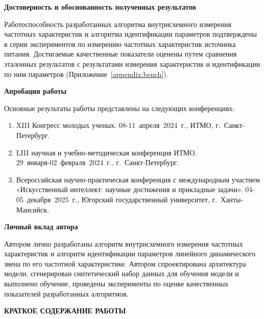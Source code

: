 \documentclass[a4paper, 14pt]{extarticle}
\begin{document}
    \noindent\textbf{Достоверность и обоснованность полученных результатов}\par
    Работоспособность разработанных алгоритма внутрисхемного измерения частотных характеристик и алгоритма идентификации параметров подтверждены в серии экспериментов по измерению частотных характеристик источника питания. Достигаемые качественные показатели оценены путем сравнения эталонных результатов с результатами измерения характеристик и идентификации по ним параметров (Приложение~\ref{appendix:bench}).

        

    \noindent\textbf{Апробация работы}\par
    Основные результаты работы представлены на следующих конференциях:
    \begin{enumerate}
        \item XIII Конгресс молодых ученых. 08-11~апреля~2024~г., ИТМО, г.~Санкт-Петербург.
        
        \item LIII научная и учебно-методическая конференция ИТМО. 29~января-02~февраля~2024~г., г.~Санкт-Петербург.
        
        \item Всероссийская научно-практическая конференция с международным участием «Искусственный интеллект: научные достижения и прикладные задачи». 04-05~декабря~2025~г., Югорский государственный университет, г.~Ханты-Мансийск.
    \end{enumerate}
    
    \noindent\textbf{Личный вклад автора}\par
    Автором лично разработаны алгоритм внутрисхемного измерения частотных характеристик и алгоритм идентификации параметров линейного динамического звена по его частотной характеристике. Автором спроектирована архитектура модели, сгенерирован синтетический набор данных для обучения модели и выполнено обучение, проведены эксперименты по оценке качественных показателей разработанных алгоритмов.
    
    \vspace{12pt}
    {\bfseries \centering КРАТКОЕ СОДЕРЖАНИЕ РАБОТЫ\par}
    \vspace{8pt}
\end{document}
